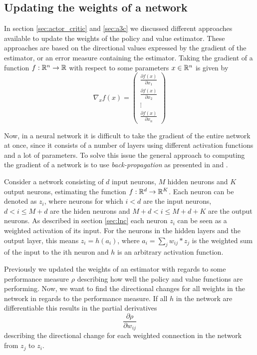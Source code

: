 \documentclass[11pt]{article}
\begin{document}
\subsection{Updating the weights of a network}

In section \ref{sec:actor_critic} and \ref{sec:a3c} we discussed different
approaches available to update the weights of the policy and value estimator.
These approaches are based on the directional values
expressed by the gradient of the estimator, or an error measure containing
the estimator.
Taking the gradient of a function $f : \mathbb{R}^n \to \mathbb{R}$ with respect to
some parameters $x \in \mathbb{R}^n$ is given by
\begin{equation}
    \nabla_x f(x)
    = \begin{pmatrix}
        \frac{\partial f(x)}{\partial x_1}\\
        \frac{\partial f(x)}{\partial x_2}\\
        \vdots\\
        \frac{\partial f(x)}{\partial x_n}
      \end{pmatrix}
\end{equation}

Now, in a neural network it is difficult to take the gradient of the
entire network at once, since it consists of a number of layers
using different activation functions and a lot of parameters.
To solve this issue the general approach to computing the gradient of a network
is to use \textit{back-propagation} as presented in \cite{IgelBackProp}
and \cite{DeepLearningBook}.

Consider a network consisting of $d$ input neurons, $M$ hidden neurons and $K$ output neurons,
estimating the function $f : \mathbb{R}^d \to \mathbb{R}^K$.
Each neuron can be denoted as $z_i$, where neurons for which $i < d$ are the input neurons, $d < i \leq M + d$ are the hiden neurons
and $M + d < i \leq M + d + K$ are the output neurons.
As described in section \ref{sec:lnc} each neuron $z_i$ can be seen as a weighted activation of its input.
For the neurons in the hidden layers and the output layer, this means $z_i = h(a_i)$, where 
$a_i = \sum_{j} w_{ij} * z_{j}$ is the weighted sum of the input to the ith neuron and $h$ is an arbitrary
activation function.

Previously we updated the weights of an estimator with regards to some performance measure $\rho$ 
describing how well the policy and value functions are performing. 
Now, we want to find the directional changes for all weights in the network
in regards to the performance measure.
If all $h$ in the network are differentiable this results in the partial derivatives
\begin{equation}\label{part}
    \frac{\partial \rho}{\partial w_{ij}}
\end{equation}
describing the directional change for each weighted connection in the network from $z_j$ to $z_i$.
\end{document}
